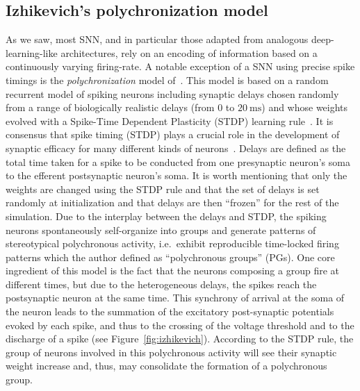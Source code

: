 \documentclass[brainsci, %
               review,submit,pdftex,moreauthors
               ]{Definitions/mdpi}
\newcommand{\ms}{\si{\milli\second}}%
\begin{document}
\subsection{Izhikevich's polychronization model}
As we saw, most SNN, and in particular those adapted from analogous deep-learning-like architectures, rely on an encoding of information based on a continuously varying firing-rate. A notable exception of a SNN using precise spike timings is the \textit{polychronization} model of~\citet{izhikevich_polychronization_2006}. This model is based on a random recurrent model of spiking neurons including synaptic delays chosen randomly from a range of biologically realistic delays (from $0$ to $20~\ms$) and whose weights evolved with a Spike-Time Dependent Plasticity (STDP) learning rule~\citep{markram_regulation_1997}. It is consensus that spike timing (STDP) plays a crucial role in the development of synaptic efficacy for many different kinds of neurons~\citep{caporale_spike_2008}. Delays are defined as the total time taken for a spike to be conducted from one presynaptic neuron's soma to the efferent postsynaptic neuron's soma. It is worth mentioning that only the weights are changed using the STDP rule and that the set of delays is set randomly at initialization and that delays are then ``frozen'' for the rest of the simulation. Due to the interplay between the delays and STDP, the spiking neurons spontaneously self-organize into groups and generate patterns of stereotypical polychronous activity, i.e.~exhibit reproducible time-locked firing patterns which  the author defined as ``polychronous groups'' (PGs). One core ingredient of this model is the fact that the neurons composing a group fire at different times, but due to the heterogeneous delays, the spikes reach the postsynaptic neuron at the same time. This synchrony of arrival at the soma of the neuron leads to the summation of the excitatory post-synaptic potentials evoked by each spike, and thus to the crossing of the voltage threshold and to the discharge of a spike (see Figure~\ref{fig:izhikevich}). According to the STDP rule, the group of neurons involved in this polychronous activity will see their synaptic weight increase and, thus, may consolidate the formation of a polychronous group. 
%
\end{document}

